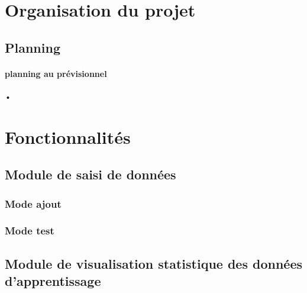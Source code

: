 \documentclass[10pt,a4paper]{report}
\begin{document}

\section{Organisation du projet}

\subsection{Planning}

\paragraph{planning au prévisionnel }
\begin{flushleft}
•
\end{flushleft}




\section{Fonctionnalités}

\subsection{Module de saisi de données}

\subsubsection{Mode ajout}
\begin{flushleft}

\end{flushleft}


\subsubsection{Mode test}
\begin{flushleft}

\end{flushleft}


\subsection{Module de visualisation statistique des données d'apprentissage}
\begin{flushleft}

\end{flushleft}
\end{document}
